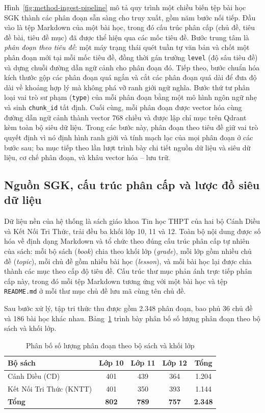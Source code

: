 \documentclass[../DoAn.tex]{subfiles}
\begin{document}
Hình~\ref{fig:method-ingest-pipeline} mô tả quy trình một chiều biến tệp bài học SGK thành các phân đoạn sẵn sàng cho truy xuất, gồm năm bước nối tiếp. Đầu vào là tệp Markdown của một bài học, trong đó cấu trúc phân cấp (chủ đề, tiêu đề bài, tiêu đề mục) đã được thể hiện qua các mốc tiêu đề. Bước trung tâm là \textit{phân đoạn theo tiêu đề}: một máy trạng thái quét tuần tự văn bản và chốt một phân đoạn mới tại mỗi mốc tiêu đề, đồng thời gán trường \texttt{level} (độ sâu tiêu đề) và dựng chuỗi đường dẫn ngữ cảnh cho phân đoạn đó. Tiếp theo, bước chuẩn hóa kích thước gộp các phân đoạn quá ngắn và cắt các phân đoạn quá dài để đưa độ dài về khoảng hợp lý mà không phá vỡ ranh giới ngữ nghĩa. Bước thứ tư phân loại vai trò sư phạm (\texttt{type}) của mỗi phân đoạn bằng một mô hình ngôn ngữ nhẹ và sinh \texttt{chunk\_id} tất định. Cuối cùng, mỗi phân đoạn được vector hóa cùng đường dẫn ngữ cảnh thành vector 768 chiều và được lập chỉ mục trên Qdrant kèm toàn bộ siêu dữ liệu. Trong các bước này, phân đoạn theo tiêu đề giữ vai trò quyết định vì nó định hình ranh giới và tính mạch lạc của mọi phân đoạn ở các bước sau; ba mục tiếp theo lần lượt trình bày chi tiết nguồn dữ liệu và siêu dữ liệu, cơ chế phân đoạn, và khâu vector hóa -- lưu trữ.

\subsection{Nguồn SGK, cấu trúc phân cấp và lược đồ siêu dữ liệu}

Dữ liệu nền của hệ thống là sách giáo khoa Tin học THPT của hai bộ Cánh Diều và Kết Nối Tri Thức, trải đều ba khối lớp 10, 11 và 12. Toàn bộ nội dung được số hóa về định dạng Markdown và tổ chức theo đúng cấu trúc phân cấp tự nhiên của sách: mỗi bộ sách (\textit{book}) chia theo khối lớp (\textit{grade}), mỗi lớp gồm nhiều chủ đề (\textit{topic}), mỗi chủ đề gồm nhiều bài học (\textit{lesson}), và mỗi bài học lại được chia thành các mục theo cấp độ tiêu đề. Cấu trúc thư mục phản ánh trực tiếp phân cấp này, trong đó mỗi tệp Markdown tương ứng với một bài học và tệp \texttt{README.md} ở mỗi thư mục chủ đề lưu mã cùng tên chủ đề.

Sau bước xử lý, tập tri thức thu được gồm 2.348 phân đoạn, bao phủ 36 chủ đề và 186 bài học khác nhau. Bảng~\ref{tab:chunk-distribution} trình bày phân bố số lượng phân đoạn theo bộ sách và khối lớp.

\begin{table}[!htbp]
\centering
\small
\begin{tabular}{|l|c|c|c|c|}
\hline
\textbf{Bộ sách} & \textbf{Lớp 10} & \textbf{Lớp 11} & \textbf{Lớp 12} & \textbf{Tổng} \\
\hline
Cánh Diều (CD) & 401 & 439 & 364 & 1.204 \\
Kết Nối Tri Thức (KNTT) & 401 & 350 & 393 & 1.144 \\
\hline
\textbf{Tổng} & \textbf{802} & \textbf{789} & \textbf{757} & \textbf{2.348} \\
\hline
\end{tabular}
\caption{Phân bố số lượng phân đoạn theo bộ sách và khối lớp}
\label{tab:chunk-distribution}
\end{table}
\end{document}
